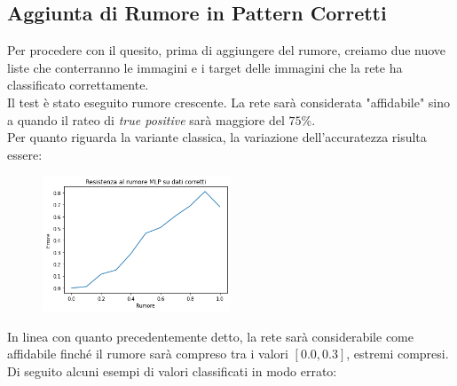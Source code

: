 \documentclass[12pt, a4paper]{article}
\begin{document}
\subsection{Aggiunta di Rumore in Pattern Corretti}
Per procedere con il quesito, prima di aggiungere del rumore, creiamo due nuove liste che conterranno le immagini e i target delle immagini che la rete ha classificato correttamente.\\
Il test è stato eseguito rumore crescente. La rete sarà considerata "affidabile" sino a quando il rateo di \textit{true positive} sarà maggiore del \(75\%\).\\
Per quanto riguarda la variante classica, la variazione dell'accuratezza risulta essere:
\begin{figure}[H]
    \centering
    \includegraphics[width=0.50\textwidth]{TPClassica.png}    
\end{figure}
In linea con quanto precedentemente detto, la rete sarà considerabile come affidabile finché il rumore sarà compreso tra i valori \([0.0, 0.3]\), estremi compresi.\\
Di seguito alcuni esempi di valori classificati in modo errato:
\end{document}
